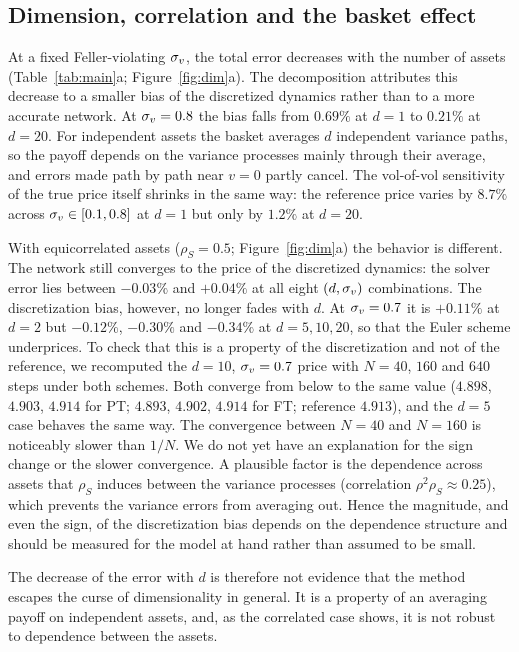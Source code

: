 \figDim
\subsection{Dimension, correlation and the basket effect}\label{sec:dimension}
At a fixed Feller-violating $\sigma_v$, the total error decreases with the number of assets (Table~\ref{tab:main}a; Figure~\ref{fig:dim}a). The decomposition attributes this decrease to a smaller bias of the discretized dynamics rather than to a more accurate network. At $\sigma_v=0.8$ the bias falls from $0.69\%$ at $d=1$ to $0.21\%$ at $d=20$. For independent assets the basket averages $d$ independent variance paths, so the payoff depends on the variance processes mainly through their average, and errors made path by path near $v=0$ partly cancel. The vol-of-vol sensitivity of the true price itself shrinks in the same way: the reference price varies by $8.7\%$ across $\sigma_v\in[0.1,0.8]$ at $d=1$ but only by $1.2\%$ at $d=20$.

With equicorrelated assets ($\rho_S=0.5$; Figure~\ref{fig:dim}a) the behavior is different. The network still converges to the price of the discretized dynamics: the solver error lies between $-0.03\%$ and $+0.04\%$ at all eight $(d,\sigma_v)$ combinations. The discretization bias, however, no longer fades with $d$. At $\sigma_v=0.7$ it is $+0.11\%$ at $d=2$ but $-0.12\%$, $-0.30\%$ and $-0.34\%$ at $d=5,10,20$, so that the Euler scheme underprices. To check that this is a property of the discretization and not of the reference, we recomputed the $d=10$, $\sigma_v=0.7$ price with $N=40$, $160$ and $640$ steps under both schemes. Both converge from below to the same value ($4.898$, $4.903$, $4.914$ for PT; $4.893$, $4.902$, $4.914$ for FT; reference $4.913$), and the $d=5$ case behaves the same way. The convergence between $N=40$ and $N=160$ is noticeably slower than $1/N$. We do not yet have an explanation for the sign change or the slower convergence. A plausible factor is the dependence across assets that $\rho_S$ induces between the variance processes (correlation $\rho^2\rho_S\approx0.25$), which prevents the variance errors from averaging out. Hence the magnitude, and even the sign, of the discretization bias depends on the dependence structure and should be measured for the model at hand rather than assumed to be small.

The decrease of the error with $d$ is therefore not evidence that the method escapes the curse of dimensionality in general. It is a property of an averaging payoff on independent assets, and, as the correlated case shows, it is not robust to dependence between the assets.

